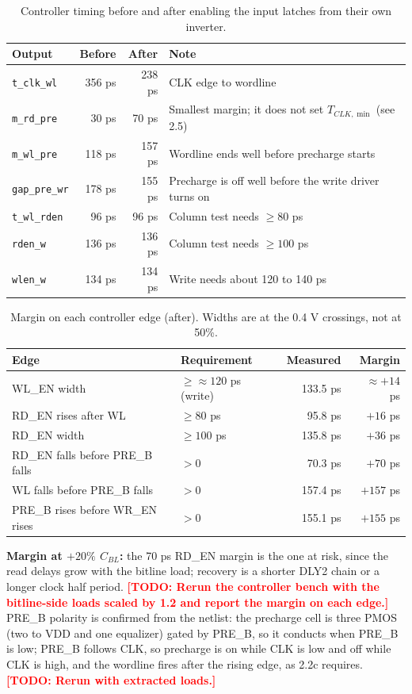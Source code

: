 \documentclass[10pt,letterpaper]{article}
\newcommand{\todo}[1]{\textcolor{red}{\textbf{[TODO: #1]}}}
\newcommand{\code}[1]{\texttt{#1}}
\begin{document}
\begin{table}[H]\centering\small\caption{Controller timing before and after enabling the input latches from their own inverter.}
\begin{tabularx}{\linewidth}{@{}lrrX@{}}\toprule Output & Before & After & Note\\\midrule
\code{t\_clk\_wl} & 356 ps & 238 ps & CLK edge to wordline\\
\code{m\_rd\_pre} & 30 ps & 70 ps & Smallest margin; it does not set $T_{CLK,\min}$ (see 2.5)\\
\code{m\_wl\_pre} & 118 ps & 157 ps & Wordline ends well before precharge starts\\
\code{gap\_pre\_wr} & 178 ps & 155 ps & Precharge is off well before the write driver turns on\\
\code{t\_wl\_rden} & 96 ps & 96 ps & Column test needs $\ge80$ ps\\
\code{rden\_w} & 136 ps & 136 ps & Column test needs $\ge100$ ps\\
\code{wlen\_w} & 134 ps & 134 ps & Write needs about 120 to 140 ps\\\bottomrule\end{tabularx}\end{table}
\begin{table}[H]\centering\small\caption{Margin on each controller edge (after). Widths are at the 0.4 V crossings, not at 50\%.}
\begin{tabularx}{\linewidth}{@{}Xlrr@{}}\toprule Edge & Requirement & Measured & Margin\\\midrule
WL\_EN width & $\ge\approx120$ ps (write) & 133.5 ps & $\approx+14$ ps\\
RD\_EN rises after WL & $\ge80$ ps & 95.8 ps & $+16$ ps\\
RD\_EN width & $\ge100$ ps & 135.8 ps & $+36$ ps\\
RD\_EN falls before PRE\_B falls & $>0$ & 70.3 ps & $+70$ ps\\
WL falls before PRE\_B falls & $>0$ & 157.4 ps & $+157$ ps\\
PRE\_B rises before WR\_EN rises & $>0$ & 155.1 ps & $+155$ ps\\\bottomrule\end{tabularx}\end{table}
\textbf{Margin at $+20\%$ $C_{BL}$:} the 70 ps RD\_EN margin is the one at risk, since the read delays grow with the bitline load; recovery is a shorter DLY2 chain or a longer clock half period. \todo{Rerun the controller bench with the bitline-side loads scaled by 1.2 and report the margin on each edge.}
PRE\_B polarity is confirmed from the netlist: the precharge cell is three PMOS (two to VDD and one equalizer) gated by PRE\_B, so it conducts when PRE\_B is low; PRE\_B follows CLK, so precharge is on while CLK is low and off while CLK is high, and the wordline fires after the rising edge, as 2.2c requires. \todo{Rerun with extracted loads.}
\end{document}
